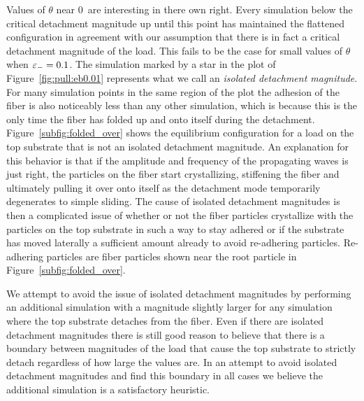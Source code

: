 Values of $\theta$ near $0$\textdegree\ are interesting in there own right. Every simulation below the critical detachment magnitude up until this point has maintained the flattened configuration in agreement with our assumption that there is in fact a critical detachment magnitude of the load. This fails to be the case for small values of $\theta$ when $\varepsilon_-=0.1$. The simulation marked by a star in the plot of Figure~\ref{fig:pull:eb0.01} represents what we call an \textit{isolated detachment magnitude}. For many simulation points in the same region of the plot the adhesion of the fiber is also noticeably less than any other simulation, which is because this is the only time the fiber has folded up and onto itself during the detachment. Figure~\ref{subfig:folded_over} shows the equilibrium configuration for a load on the top substrate that is not an isolated detachment magnitude. An explanation for this behavior is that if the amplitude and frequency of the propagating waves is just right, the particles on the fiber start crystallizing, stiffening the fiber and ultimately pulling it over onto itself as the detachment mode temporarily degenerates to simple sliding. The cause of isolated detachment magnitudes is then a complicated issue of whether or not the fiber particles crystallize with the particles on the top substrate in such a way to stay adhered or if the substrate has moved laterally a sufficient amount already to avoid re-adhering particles. Re-adhering particles are fiber particles shown near the root particle in Figure~\ref{subfig:folded_over}.

We attempt to avoid the issue of isolated detachment magnitudes by performing an additional simulation with a magnitude slightly larger for any simulation where the top substrate detaches from the fiber. Even if there are isolated detachment magnitudes there is still good reason to believe that there is a boundary between magnitudes of the load that cause the top substrate to strictly detach regardless of how large the values are. In an attempt to avoid isolated detachment magnitudes and find this boundary in all cases we believe the additional simulation is a satisfactory heuristic.

